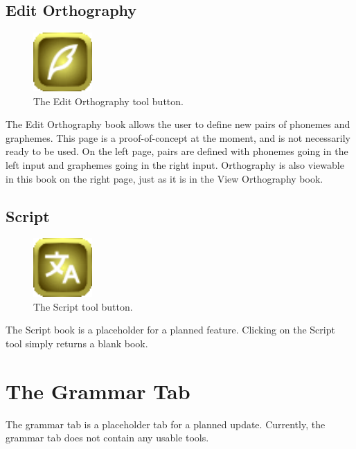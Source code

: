 \documentclass{report}
\begin{document}
	\section{Edit Orthography}
	\begin{figure}
		\centering
		\includegraphics[width=0.2\textwidth]{img/edit-orthography}
		\caption{The Edit Orthography tool button.}
		\label{fig:edit-orthography}
	\end{figure}
	The Edit Orthography book allows the user to define new pairs of phonemes and graphemes. This page is a proof-of-concept at the moment, and is not necessarily ready to be used. On the left page, pairs are defined with phonemes going in the left input and graphemes going in the right input. Orthography is also viewable in this book on the right page, just as it is in the View Orthography book.
	\section{Script}
	\begin{figure}
		\centering
		\includegraphics[width=0.2\textwidth]{img/script}
		\caption{The Script tool button.}
		\label{fig:script}
	\end{figure}
	The Script book is a placeholder for a planned feature. Clicking on the Script tool simply returns a blank book.
	
	\chapter{The Grammar Tab}
	The grammar tab is a placeholder tab for a planned update. Currently, the grammar tab
	does not contain any usable tools.
	
\end{document}
